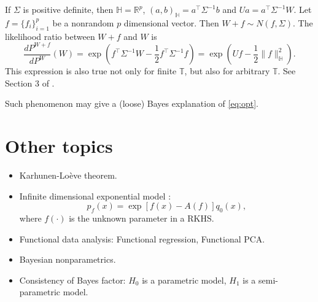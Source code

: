 \documentclass[11pt]{article}
\theoremstyle{plain}
\theoremstyle{definition}
\theoremstyle{remark}
\begin{document}
    If $\Sigma $ is positive definite, then $\mathbb H =\mathbb R^p$, $(a,b)_{\mathbb H}= a^\top \Sigma^{-1} b$ and $Ua=a^\top \Sigma^{-1} W $.
    Let $f=\{f_i\}_{i=1}^p$ be a nonrandom $p$ dimensional vector.
    Then $W+f\sim N(f,\Sigma)$. The likelihood ratio between $W+f$ and $W$ is
    \begin{equation*}
        \frac{dP^{W+f}}{dP^W} (W)=
        \exp\left(
            f^\top \Sigma^{-1} W -\frac{1}{2} f^\top \Sigma^{-1} f
        \right)
        =
        \exp\left(
            Uf -\frac{1}{2} \|f\|_{\mathbb H}^2
        \right).
    \end{equation*}
    This expression is also true not only for finite $\mathbb T$, but also for arbitrary $\mathbb T$. 
    See Section 3 of \cite{vandervaart}.


    Such phenomenon may give a (loose) Bayes explanation of \eqref{eq:opt}.









\section{Other topics}

\begin{itemize}
    \item 
        Karhunen-Lo\`eve theorem.
\item
    Infinite dimensional exponential model \cite{Bharath2017}:
    \begin{equation*}
        p_f(x)= \exp [f(x)-A(f)]  q_0 (x),
    \end{equation*}
    where $f(\cdot)$ is the unknown parameter in a RKHS.

\item 
    Functional data analysis: Functional regression, Functional PCA.
\item
     Bayesian nonparametrics.
 \item
     Consistency of Bayes factor: $H_0$ is a parametric model, $H_1$ is a semi-parametric model.

\end{itemize}








\end{document}

